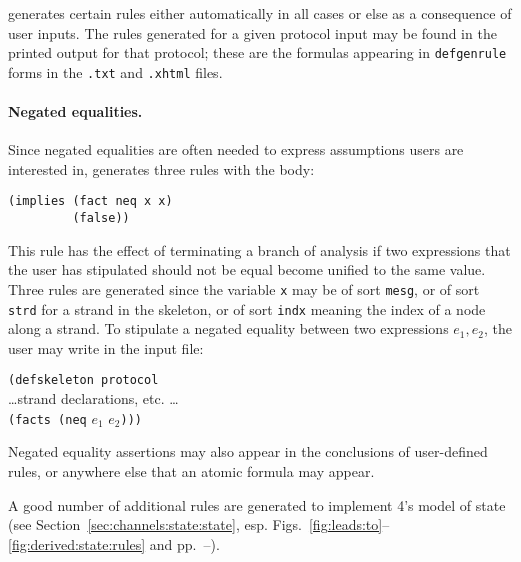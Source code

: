 {\cpsa} generates certain rules either automatically in all cases or
else as a consequence of user inputs.  The rules generated for a given
protocol input may be found in the printed output for that protocol;
these are the formulas appearing in \texttt{defgenrule} forms in the
\texttt{.txt} and \texttt{.xhtml} files.

\paragraph{Negated equalities.}  Since negated equalities are often
needed to express assumptions users are interested in, {\cpsa}
generates three rules with the body:
%
\begin{verbatim}(implies (fact neq x x)
         (false))
\end{verbatim}
%
This rule has the effect of terminating a branch of analysis if two
expressions that the user has stipulated should not be equal become
unified to the same value.  Three rules are generated since the
variable \verb|x| may be of sort \verb|mesg|, or of sort \verb|strd|
for a strand in the skeleton, or of sort \verb|indx| meaning the index
of a node along a strand.  To stipulate a negated equality between two
expressions $e_1,e_2$, the user may write in the input file:
%
\begin{tabbing}
\texttt{(de}\=\texttt{fskeleton protocol}  \\
  \>\dots strand declarations, etc. \dots \\
  \>\texttt{(facts (neq} $e_1$ $e_2$\texttt{)))}
\end{tabbing}
%
Negated equality assertions may also appear in the conclusions of
user-defined rules, or anywhere else that an atomic formula may
appear.

A good number of additional rules are generated to implement {\cpsa}
4's model of state (see Section~\ref{sec:channels:state:state},
esp. Figs.~\ref{fig:leads:to}--\ref{fig:derived:state:rules} and
pp.~\pageref{state:gen:rules:start}--\pageref{state:gen:rules:end}).

